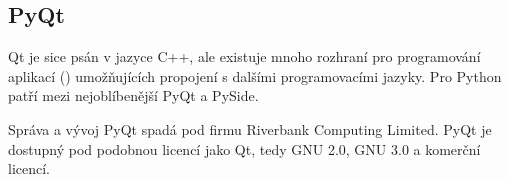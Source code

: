 
\subsection{PyQt}
Qt je sice psán v jazyce C++, ale existuje mnoho rozhraní pro programování aplikací () umožňujících propojení s dalšími programovacími jazyky. Pro Python patří mezi nejoblíbenější PyQt a PySide.

Správa a vývoj PyQt spadá pod firmu Riverbank Computing Limited. PyQt je dostupný pod podobnou licencí jako Qt, tedy GNU  2.0, GNU  3.0 a komerční licencí.


